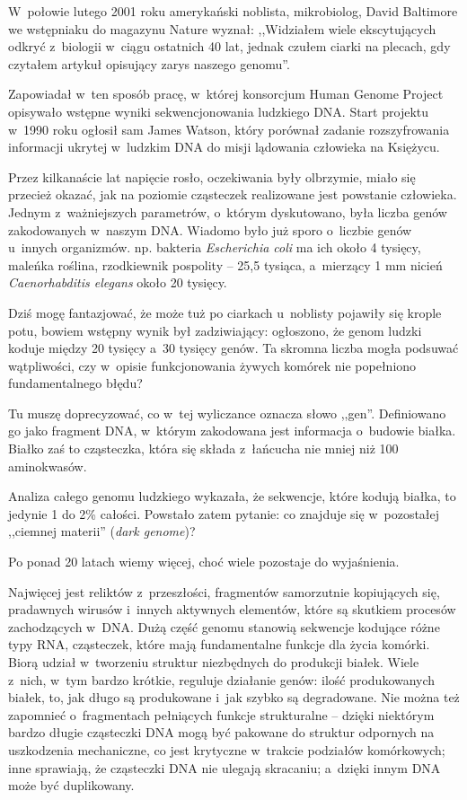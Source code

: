 


{%
W połowie lutego 2001 roku amerykański noblista, mikrobiolog, David Baltimore we wstępniaku do magazynu Nature wyznał: ,,Widziałem wiele ekscytujących odkryć z biologii w ciągu ostatnich 40 lat, jednak czułem ciarki na plecach, gdy czytałem artykuł opisujący zarys naszego genomu''. 

Zapowiadał w ten sposób pracę, w której konsorcjum Human Genome Project opisywało wstępne wyniki sekwencjonowania ludzkiego DNA. Start projektu w 1990 roku ogłosił sam James Watson, który porównał zadanie rozszyfrowania informacji ukrytej w ludzkim DNA do misji lądowania człowieka na Księżycu. 

Przez kilkanaście lat napięcie rosło, oczekiwania były olbrzymie, miało się przecież okazać, jak na poziomie cząsteczek realizowane jest powstanie człowieka. Jednym z ważniejszych parametrów, o którym dyskutowano, była liczba genów
zakodowanych w~naszym DNA.
Wiadomo było już sporo o liczbie genów u innych organizmów.  np. bakteria \textit{Escherichia coli} ma ich około 4 tysięcy, maleńka roślina, rzodkiewnik pospolity -- 25,5 tysiąca, a mierzący 1 mm nicień \textit{Caenorhabditis elegans} około 20 tysięcy. 

Dziś mogę fantazjować, że może tuż po ciarkach u noblisty pojawiły się  krople potu, bowiem wstępny wynik był zadziwiający: ogłoszono, że genom ludzki koduje między 20 tysięcy a 30 tysięcy genów. Ta  skromna liczba mogła podsuwać wątpliwości, czy w opisie funkcjonowania żywych komórek nie popełniono fundamentalnego błędu?

Tu muszę doprecyzować, co w tej wyliczance oznacza słowo ,,gen''. Definiowano go jako fragment DNA, w którym zakodowana jest informacja o budowie białka. Białko zaś to cząsteczka, która się składa z łańcucha nie mniej niż 100 aminokwasów. 

Analiza całego genomu ludzkiego wykazała, że sekwencje, które kodują białka, to jedynie 1 do 2\% całości. Powstało zatem pytanie: co znajduje się w pozostałej ,,ciemnej materii'' (\textit{dark genome})?

Po ponad 20 latach wiemy  więcej, choć wiele pozostaje do wyjaśnienia. 

Najwięcej jest reliktów z przeszłości, fragmentów samorzutnie kopiujących się, pradawnych wirusów i innych aktywnych elementów, które są skutkiem procesów zachodzących w DNA. Dużą część genomu stanowią sekwencje kodujące różne typy RNA, cząsteczek, które mają fundamentalne funkcje dla życia komórki. Biorą udział w tworzeniu struktur niezbędnych do produkcji białek. Wiele z nich, w tym bardzo krótkie, reguluje działanie genów: ilość produkowanych białek, to, jak długo są produkowane i jak szybko są degradowane. Nie można też zapomnieć o fragmentach pełniących funkcje strukturalne -- dzięki niektórym bardzo długie cząsteczki DNA mogą być pakowane do struktur odpornych na uszkodzenia mechaniczne, co jest krytyczne w trakcie podziałów komórkowych; inne sprawiają, że cząsteczki DNA nie ulegają skracaniu; a dzięki innym DNA może być duplikowany.  

}
